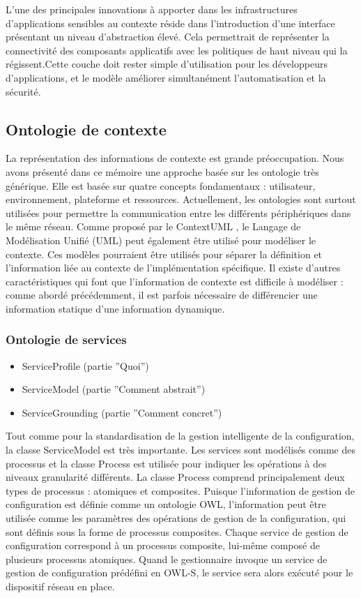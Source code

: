 L'une des principales innovations à apporter dans les infrastructures
d'applications sensibles au contexte réside dans l'introduction d'une interface
présentant un niveau d'abstraction élevé. Cela permettrait de représenter la
connectivité des composants applicatifs avec les politiques de haut niveau qui
la régissent.Cette couche doit rester simple d'utilisation pour les
développeurs d'applications, et le modèle améliorer simultanément
l'automatisation et la sécurité.

\subsection{Ontologie de contexte}

La représentation des informations de contexte est grande préoccupation. Nous
avons présenté dans ce mémoire une approche basée sur les ontologie très
générique. Elle est basée sur quatre concepts fondamentaux : utilisateur,
environnement, plateforme et ressources. Actuellement, les ontologies sont
surtout utilisées pour permettre la communication entre les différents
périphériques dans le même réseau. Comme proposé par le ContextUML
\cite{sheng_contextuml:_2005}, le Langage de Modélisation Unifié (UML) peut
également être utilisé pour modéliser le contexte. Ces modèles pourraient être
utilisés pour séparer la définition et l'information liée au contexte de
l'implémentation spécifique. Il existe d'autres caractéristiques qui font que
l'information de contexte est difficile à modéliser : comme abordé précédemment,
il est parfois nécessaire de différencier une information statique d'une
information dynamique.

\subsubsection{Ontologie de services}

\begin{itemize}
  \item ServiceProfile (partie ''Quoi'')
  \item ServiceModel (partie ''Comment abstrait'')
  \item ServiceGrounding (partie ''Comment concret'')
\end{itemize}

Tout comme pour la standardisation de la gestion intelligente de la
configuration, la classe ServiceModel est très importante. Les services sont
modélisés comme des processus et la classe Process est utilisée pour indiquer
les opérations à des niveaux granularité différents. La classe Process comprend
principalement deux types de processus : atomiques et composites. Puisque
l'information de gestion de configuration est définie comme un ontologie OWL,
l'information peut être utilisée comme les paramètres des opérations de gestion
de la configuration, qui sont définis sous la forme de processus composites.
Chaque service de gestion de configuration correspond à un processus composite,
lui-même composé de plusieurs processus atomiques. Quand le gestionnaire invoque
un service de gestion de configuration prédéfini en OWL-S, le service sera alors
exécuté pour le dispositif réseau en place.

